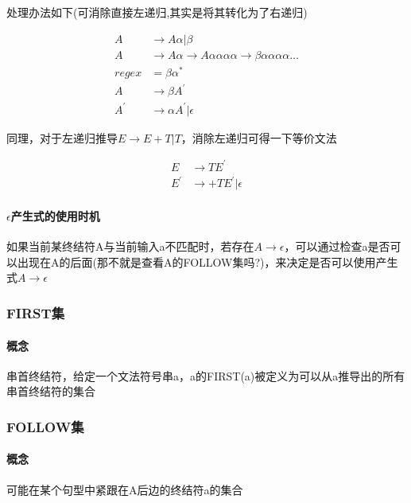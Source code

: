 \documentclass[UTF8]{ctexart} %
\begin{document}
处理办法如下(可消除直接左递归,其实是将其转化为了右递归)

\begin{equation}
    \begin{aligned}
        A     & \rightarrow A\alpha|\beta              \\
        A     & \rightarrow A\alpha
        \rightarrow A\alpha\alpha\alpha\alpha
        \rightarrow \beta\alpha\alpha\alpha\alpha\dots \\
        regex & =\beta\alpha^*                         \\
        A     & \rightarrow \beta A^{'}                \\
        A^{'} & \rightarrow \alpha A^{'}|\epsilon
    \end{aligned}
\end{equation}

同理，对于左递归推导$E\rightarrow E+T|T$，消除左递归可得一下等价文法

\begin{equation}
    \begin{aligned}
        E     & \rightarrow TE^{'}           \\
        E^{'} & \rightarrow +TE^{'}|\epsilon
    \end{aligned}
\end{equation}

\paragraph{$\epsilon$产生式的使用时机} 如果当前某终结符A与当前输入a不匹配时，若存在$A\rightarrow\epsilon$，可以通过检查a是否可以出现在A的后面(那不就是查看A的FOLLOW集吗?)，来决定是否可以使用产生式$A\rightarrow\epsilon$

\subsubsection{FIRST集}

\paragraph{概念} 串首终结符，给定一个文法符号串a，a的FIRST(a)被定义为可以从a推导出的所有串首终结符的集合

\subsubsection{FOLLOW集}

\paragraph{概念} 可能在某个句型中紧跟在A后边的终结符a的集合
\end{document}
